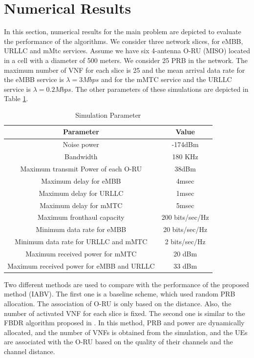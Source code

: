 \documentclass[conference]{IEEEtran}
\begin{document}
\section{Numerical Results}\label{NE}
In this section, numerical results for the main problem are depicted to evaluate the performance of the algorithms. We consider three network slices, for eMBB, URLLC and mMtc services.
Assume we have six 4-antenna O-RU (MISO) located in a cell with a diameter of 500 meters. We consider 25 PRB in the network.
The maximum number of VNF for each slice is 25 and the mean arrival data rate for the eMBB service is $\lambda  = 3Mbps$ and for the mMTC service and the URLLC  service is $\lambda  = 0.2Mbps$. 
The other parameters of these simulations are depicted in Table \ref{table:1a}.
\begin{table}
 \caption {Simulation Parameter} \label{table:1a}
 \begin{center}
  \begin{tabular}{||c c ||}
  \hline
Parameter & Value \\ [0.5ex]
  \hline\hline
  Noise power & -174dBm\\
  \hline
  Bandwidth & 180 KHz \\
  \hline
 Maximum transmit Power of each O-RU & 38dBm \\
  \hline
  Maximum delay for eMBB &  4msec \\
  \hline
    Maximum delay for URLLC &  1msec \\
  \hline
  Maximum delay for mMTC &  5msec \\
  \hline
  Maximum fronthaul capacity  & 200 bits/sec/Hz \\
   \hline
  Minimum data rate for eMBB &  20 bits/sec/Hz \\ 
  \hline
   Minimum data rate for URLLC and mMTC &  2 bits/sec/Hz \\ 
  \hline
   Maximum received power for mMTC &  20 dBm \\ [.5ex]   
  \hline
    Maximum received power for eMBB and URLLC &  33 dBm \\ [.5ex]   
  \hline
 \end{tabular}
 \end{center}
 \end{table}
Two different methods are used to compare with the performance of the proposed method (IABV).
 The first one is a baseline scheme, which used random PRB allocation. The association of O-RU is only based on the distance. Also, the number of activated VNF for each slice is fixed. 
The second one is similar to the FBDR algorithm proposed in \cite{lee2018dynamic}. In this method, PRB and power are dynamically allocated, and the number of VNFs is obtained from the simulation, and the UEs are associated with the O-RU based on the quality of their channels and the channel distance.
\end{document}
